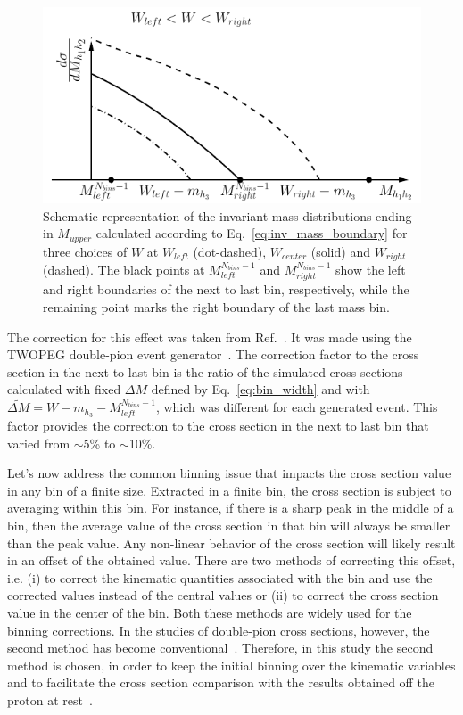 \begin{figure}[htp]
\begin{center}
\includegraphics[width=12cm]{pictures/corrections/mass_tex.pdf}
\caption{\small  Schematic representation of the invariant mass distributions ending in $M_{upper}$ calculated according to Eq.~\eqref{eq:inv_mass_boundary} for three choices of $W$ at $W_{left}$ (dot-dashed), $W_{center}$ (solid) and $W_{right}$ (dashed). The black points at $M^{N_{bins}-1}_{left}$ and $M^{N_{bins}-1}_{right}$ show the left and right boundaries of the next to last bin, respectively, while the remaining point marks the right boundary of the last mass bin.} \label{fig:mass_corr}
\end{center}
\end{figure}


The correction for this effect was taken from Ref.~\cite{Fed_an_note:2017,Fed_paper_2018}. It was made using the TWOPEG double-pion event generator~\cite{twopeg}. The correction factor to the cross section in the next to last bin is the ratio of the simulated cross sections calculated with fixed $\Delta M$ defined by Eq.~\eqref{eq:bin_width} and with $\widetilde{\Delta M} = W-m_{h_{3}} - M^{N_{bins}-1}_{left}$, which was different for each generated event. This factor provides the correction to the cross section in the next to last bin that varied from $\sim$5\% to $\sim$10\%.


Let's now address the common binning issue that impacts the cross section value in any bin of a finite size. Extracted in a finite bin, the cross section is subject to averaging within this bin. For instance, if there is a sharp peak in the middle of a bin, then the average value of the cross section in that bin will always be smaller than the peak value. Any non-linear behavior of the cross section will likely result in an offset of the obtained value. There are two methods of correcting this offset, i.e. (i) to correct the kinematic quantities associated with the bin and use the corrected values instead of the central values or (ii) to correct the cross section value in the center of the bin. Both these methods are widely used for the binning corrections. In the studies of double-pion cross sections, however, the second method has become conventional~\cite{Fed_an_note:2007,Fedotov:2008aa,Fed_an_note:2017,Fed_paper_2018}. Therefore, in this study the second method is chosen, in order to keep the initial binning over the kinematic variables and to facilitate the cross section comparison with the results obtained off the proton at rest~\cite{Fed_an_note:2017,Fed_paper_2018}.

